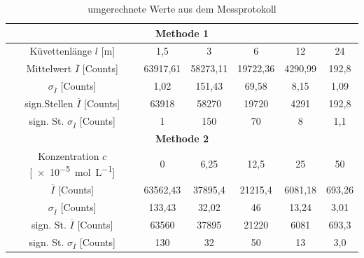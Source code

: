 \renewcommand{\arraystretch}{1.3}  
\begin{table}[htbp]
    \centering
\begin{tabular}{|c|ccccc|}
\hline
                                          \multicolumn{6}{|c|}{\textbf{Methode 1}}                    \\ \hline
Küvettenlänge \(l\) [\unit{\meter}]                                        & 1,5    & 3        & 6        & 12      & 24     \\ \hline
Mittelwert \(\overline{I}\) [Counts] & 63917,61 & 58273,11 & 19722,36 & 4290,99 & 192,8  \\
\(\sigma_{\overline{I}}\) [Counts]     & 1,02     & 151,43   & 69,58    & 8,15    & 1,09   \\ \hline
sign.Stellen \(\overline{I}\) [Counts] & 63918 & 58270 & 19720 & 4291 & 192,8  \\
sign. St. \(\sigma_{\overline{I}}\) [Counts]     & 1     & 150   & 70    & 8    & 1,1   \\ 
\hline\hline
                                          \multicolumn{6}{|c|}{\textbf{Methode 2}}                    \\ \hline
Konzentration \(c\) [\qty{e-5}{\mole\per\liter}] & 0     & 6,25    & 12,5    & 25    & 50  \\ \hline
\(\overline{I}\) [Counts]             & 63562,43 & 37895,4  & 21215,4  & 6081,18 & 693,26 \\
\(\sigma_{\overline{I}}\) [Counts]    & 133,43   & 32,02    & 46       & 13,24   & 3,01   \\ \hline
sign. St. \(\overline{I}\) [Counts]             & 63560 & 37895  & 21220  & 6081 & 693,3 \\
sign. St. \(\sigma_{\overline{I}}\) [Counts]    & 130   & 32    & 50       & 13   & 3,0   \\ \hline
\end{tabular}
\caption{umgerechnete Werte aus dem Messprotokoll}
\label{table:Werte}
\end{table}